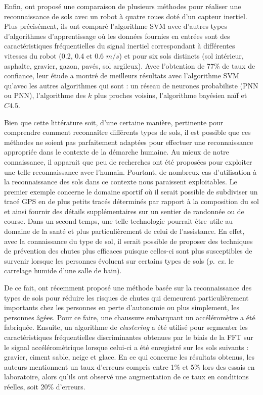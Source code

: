 Enfin, \cite{Weiss2007} ont proposé une comparaison de plusieurs méthodes pour réaliser une reconnaissance de sols avec un robot à quatre roues doté d'un capteur inertiel. Plus précisément, ils ont comparé l'algorithme \acs{SVM} avec d'autres types d'algorithmes d'apprentissage où les données fournies en entrées sont des caractéristiques fréquentielles du signal inertiel correspondant à différentes vitesses du robot (0.2, 0.4 et 0.6 $m/s$) et pour six sols distincts (sol intérieur, asphalte, gravier, gazon, pavés, sol argileux). Avec l'obtention de 77\% de taux de confiance, leur étude a montré de meilleurs résultats avec l'algorithme \acs{SVM} qu'avec les autres algorithmes qui sont : un réseau de neurones probabiliste (\acl{PNN} ou \acs{PNN}), l'algorithme des $k$ plus proches voisins, l'algorithme bayésien naïf et $C4.5$.

Bien que cette littérature soit, d'une certaine manière, pertinente pour comprendre comment reconnaître différents types de sols, il est possible que ces méthodes ne soient pas parfaitement adaptées pour effectuer une reconnaissance appropriée dans le contexte de la démarche humaine. Au mieux de notre connaissance, il apparait que peu de recherches ont été proposées pour exploiter une telle reconnaissance avec l'humain. Pourtant, de nombreux cas d'utilisation à la reconnaissance des sols dans ce contexte nous paraissent exploitables. Le premier exemple concerne le domaine sportif où il serait possible de subdiviser un tracé \acs{GPS} en de plus petits tracés déterminés par rapport à la composition du sol et ainsi fournir des détails supplémentaires sur un sentier de randonnée ou de course. Dans un second temps, une telle technologie pourrait être utile au domaine de la santé et plus particulièrement de celui de l'assistance. En effet, avec la connaissance du type de sol, il serait possible de proposer des techniques de prévention des chutes plus efficaces puisque celles-ci sont plus susceptibles de survenir lorsque les personnes évoluent sur certains types de sols (\textit{p. ex.} le carrelage humide d'une salle de bain).

De ce fait, \cite{Otis2016} ont récemment proposé une méthode basée sur la reconnaissance des types de sols pour réduire les risques de chutes qui demeurent particulièrement importants chez les personnes en perte d'autonomie ou plus simplement, les personnes âgées. Pour ce faire, une chaussure embarquant un accéléromètre a été fabriquée. Ensuite, un algorithme de \textit{clustering} a été utilisé pour segmenter les caractéristiques fréquentielles discriminantes obtenues par le biais de la \acs{FFT} sur le signal accéléromètrique lorsque celui-ci a été enregistré sur les sols suivants : gravier, ciment sable, neige et glace. En ce qui concerne les résultats obtenus, les auteurs mentionnent un taux d'erreurs compris entre 1\% et 5\% lors des essais en laboratoire, alors qu’ils ont observé une augmentation de ce taux en conditions réelles, soit 20\% d'erreurs.

